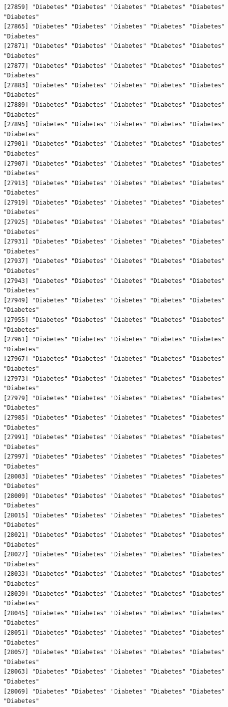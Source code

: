 \documentclass[
  letterpaper,
  DIV=11,
  numbers=noendperiod]{scrartcl}
\begin{document}
\begin{verbatim}
[27859] "Diabetes" "Diabetes" "Diabetes" "Diabetes" "Diabetes" "Diabetes"
[27865] "Diabetes" "Diabetes" "Diabetes" "Diabetes" "Diabetes" "Diabetes"
[27871] "Diabetes" "Diabetes" "Diabetes" "Diabetes" "Diabetes" "Diabetes"
[27877] "Diabetes" "Diabetes" "Diabetes" "Diabetes" "Diabetes" "Diabetes"
[27883] "Diabetes" "Diabetes" "Diabetes" "Diabetes" "Diabetes" "Diabetes"
[27889] "Diabetes" "Diabetes" "Diabetes" "Diabetes" "Diabetes" "Diabetes"
[27895] "Diabetes" "Diabetes" "Diabetes" "Diabetes" "Diabetes" "Diabetes"
[27901] "Diabetes" "Diabetes" "Diabetes" "Diabetes" "Diabetes" "Diabetes"
[27907] "Diabetes" "Diabetes" "Diabetes" "Diabetes" "Diabetes" "Diabetes"
[27913] "Diabetes" "Diabetes" "Diabetes" "Diabetes" "Diabetes" "Diabetes"
[27919] "Diabetes" "Diabetes" "Diabetes" "Diabetes" "Diabetes" "Diabetes"
[27925] "Diabetes" "Diabetes" "Diabetes" "Diabetes" "Diabetes" "Diabetes"
[27931] "Diabetes" "Diabetes" "Diabetes" "Diabetes" "Diabetes" "Diabetes"
[27937] "Diabetes" "Diabetes" "Diabetes" "Diabetes" "Diabetes" "Diabetes"
[27943] "Diabetes" "Diabetes" "Diabetes" "Diabetes" "Diabetes" "Diabetes"
[27949] "Diabetes" "Diabetes" "Diabetes" "Diabetes" "Diabetes" "Diabetes"
[27955] "Diabetes" "Diabetes" "Diabetes" "Diabetes" "Diabetes" "Diabetes"
[27961] "Diabetes" "Diabetes" "Diabetes" "Diabetes" "Diabetes" "Diabetes"
[27967] "Diabetes" "Diabetes" "Diabetes" "Diabetes" "Diabetes" "Diabetes"
[27973] "Diabetes" "Diabetes" "Diabetes" "Diabetes" "Diabetes" "Diabetes"
[27979] "Diabetes" "Diabetes" "Diabetes" "Diabetes" "Diabetes" "Diabetes"
[27985] "Diabetes" "Diabetes" "Diabetes" "Diabetes" "Diabetes" "Diabetes"
[27991] "Diabetes" "Diabetes" "Diabetes" "Diabetes" "Diabetes" "Diabetes"
[27997] "Diabetes" "Diabetes" "Diabetes" "Diabetes" "Diabetes" "Diabetes"
[28003] "Diabetes" "Diabetes" "Diabetes" "Diabetes" "Diabetes" "Diabetes"
[28009] "Diabetes" "Diabetes" "Diabetes" "Diabetes" "Diabetes" "Diabetes"
[28015] "Diabetes" "Diabetes" "Diabetes" "Diabetes" "Diabetes" "Diabetes"
[28021] "Diabetes" "Diabetes" "Diabetes" "Diabetes" "Diabetes" "Diabetes"
[28027] "Diabetes" "Diabetes" "Diabetes" "Diabetes" "Diabetes" "Diabetes"
[28033] "Diabetes" "Diabetes" "Diabetes" "Diabetes" "Diabetes" "Diabetes"
[28039] "Diabetes" "Diabetes" "Diabetes" "Diabetes" "Diabetes" "Diabetes"
[28045] "Diabetes" "Diabetes" "Diabetes" "Diabetes" "Diabetes" "Diabetes"
[28051] "Diabetes" "Diabetes" "Diabetes" "Diabetes" "Diabetes" "Diabetes"
[28057] "Diabetes" "Diabetes" "Diabetes" "Diabetes" "Diabetes" "Diabetes"
[28063] "Diabetes" "Diabetes" "Diabetes" "Diabetes" "Diabetes" "Diabetes"
[28069] "Diabetes" "Diabetes" "Diabetes" "Diabetes" "Diabetes" "Diabetes"

\end{verbatim}
\end{document}
